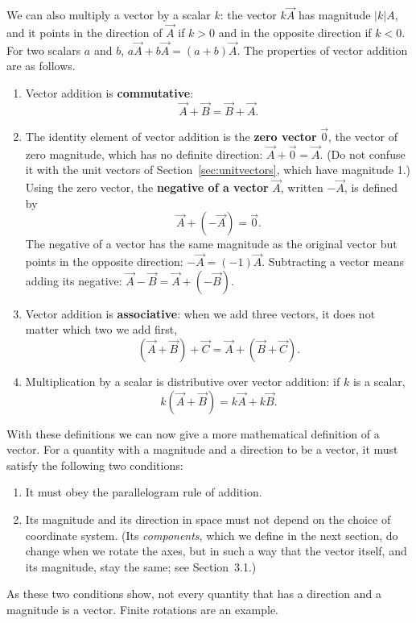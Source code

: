 \documentclass[11pt,a4paper]{article}
\begin{document}
We can also multiply a vector by a scalar $k$: the vector $k\vec{A}$ has magnitude $|k|A$, and it
points in the direction of $\vec{A}$ if $k>0$ and in the opposite direction if $k<0$. For two
scalars $a$ and $b$, $a\vec{A} + b\vec{A} = (a+b)\vec{A}$. The properties of vector addition are as
follows.
\begin{enumerate}
  \item Vector addition is \textbf{commutative}:
    \begin{equation}\label{eq:comm}
      \vec{A} + \vec{B} = \vec{B} + \vec{A} .
    \end{equation}
  \item The identity element of vector addition is the \textbf{zero vector} $\vec{0}$, the vector
    of zero magnitude, which has no definite direction: $\vec{A} + \vec{0} = \vec{A}$. (Do not
    confuse it with the unit vectors of Section~\ref{sec:unitvectors}, which have magnitude 1.) Using the zero vector, the \textbf{negative of
    a vector} $\vec{A}$, written $-\vec{A}$, is defined by
    \begin{equation}\label{eq:neg}
      \vec{A} + (-\vec{A}) = \vec{0} .
    \end{equation}
    The negative of a vector has the same magnitude as the original vector but points in the
    opposite direction: $-\vec{A} = (-1)\vec{A}$. Subtracting a vector means adding its negative:
    $\vec{A} - \vec{B} = \vec{A} + (-\vec{B})$.
  \item Vector addition is \textbf{associative}: when we add three vectors, it does not matter
    which two we add first,
    \begin{equation}\label{eq:assoc}
      (\vec{A} + \vec{B}) + \vec{C} = \vec{A} + (\vec{B} + \vec{C}) .
    \end{equation}
  \item Multiplication by a scalar is distributive over vector addition: if $k$ is a scalar,
    \begin{equation}\label{eq:distr}
      k(\vec{A} + \vec{B}) = k\vec{A} + k\vec{B} .
    \end{equation}
\end{enumerate}
With these definitions we can now give a more mathematical definition of a vector. For a quantity
with a magnitude and a direction to be a vector, it must satisfy the following two conditions:
\begin{enumerate}
  \item It must obey the parallelogram rule of addition.
  \item Its magnitude and its direction in space must not depend on the choice of coordinate
    system. (Its \emph{components}, which we define in the next section, do change when we rotate
    the axes, but in such a way that the vector itself, and its magnitude, stay the same; see
    Section~3.1.)
\end{enumerate}
As these two conditions show, not every quantity that has a direction and a magnitude is a vector.
Finite rotations are an example.
\end{document}
